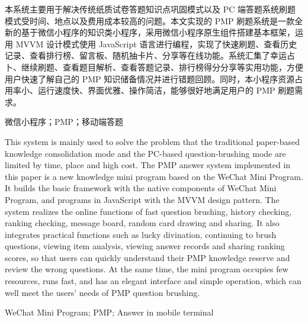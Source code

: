 
\begin{cnabstract}
本系统主要用于解决传统纸质试卷答题知识点巩固模式以及 PC 端答题系统刷题模式受时间、地点以及费用成本较高的问题。本文实现的 PMP 刷题系统是一款全新的基于微信小程序的知识类小程序，采用微信小程序原生组件搭建基本框架，运用 MVVM 设计模式使用 JavaScript 语言进行编程，实现了快速刷题、查看历史记录、查看排行榜、留言板、随机抽卡片、分享等在线功能。系统汇集了幸运占卜、继续刷题、查看题目解析、查看答题记录、排行榜得分分享等实用功能，方便用户快速了解自己的 PMP 知识储备情况并进行错题回顾。同时，本小程序资源占用率小、运行速度快、界面优雅、操作简洁，能够很好地满足用户的 PMP 刷题需求。
\end{cnabstract}

\begin{cnkeywords}
微信小程序；PMP；移动端答题
\end{cnkeywords}

\begin{enabstract}
This system is mainly used to solve the problem that the traditional paper-based
knowledge consolidation mode and the PC-based question-brushing mode are limited
by time, place and high cost. The PMP answer system implemented in this paper is
a new knowledge mini program based on the WeChat Mini Program. It builds the
basic framework with the native components of WeChat Mini Program, and programs
in JavaScript with the MVVM design pattern. The system realizes the online
functions of fast question brushing, history checking, ranking checking, message
board, random card drawing and sharing. It also integrates practical functions
such as lucky divination, continuing to brush questions, viewing item analysis,
viewing answer records and sharing ranking scores, so that users can quickly
understand their PMP knowledge reserve and review the wrong questions. At the
same time, the mini program occupies few resources, runs fast, and has an
elegant interface and simple operation, which can well meet the users' needs of
PMP question brushing.
\end{enabstract}

\begin{enkeywords}
WeChat Mini Program; PMP; Answer in mobile terminal
\end{enkeywords}
